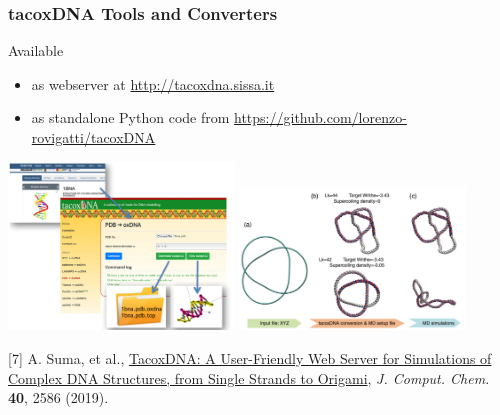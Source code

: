 \documentclass[slidestop,compress,9pt]{beamer}
\begin{document}
\begin{frame}
\frametitle{tacoxDNA Tools and Converters}

Available
\begin{itemize}
\item as webserver at \href{http://tacoxdna.sissa.it}{http://tacoxdna.sissa.it}
\item as standalone Python code from \href{https://github.com/lorenzo-rovigatti/tacoxDNA}{https://github.com/lorenzo-rovigatti/tacoxDNA}
\end{itemize}

\vspace*{0.5cm}
\includegraphics[width=0.45\textwidth]{tacoxDNA_pdb.jpg}
\includegraphics[width=0.45\textwidth]{tacoxDNA_trefoil.jpg}\\
\vspace*{0.5cm}

[7] A. Suma, et al., \href{https://doi.org/10.1002/jcc.26029}{TacoxDNA: A User-Friendly Web Server for Simulations of Complex DNA Structures, from Single Strands to Origami}, \textit{J. Comput. Chem.} \textbf{40}, 2586 (2019).

\end{frame}
\end{document}
